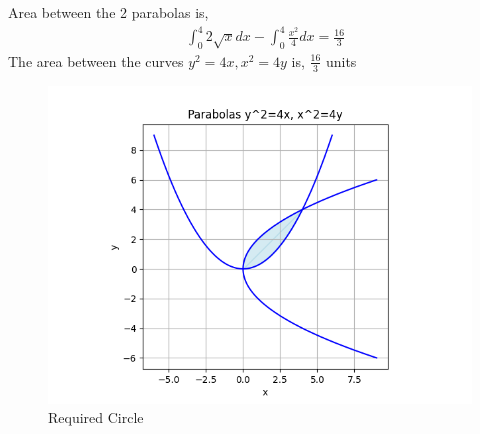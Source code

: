 \documentclass[journal]{IEEEtran}
\begin{document}
Area between the 2 parabolas is,
\begin{align}
	&\int_0^4 2\sqrt{x}dx- \int_0^4 \frac{x^2}{4}dx = \frac{16}{3}
\end{align}
The area between the curves $y^2=4x, x^2=4y$ is, $\frac{16}{3}$ units
\begin{figure}[h!]
   \centering
   \includegraphics[width = 1\linewidth]{figs/fig.png}
   \caption{Required Circle}
   \label{stemplot}
\end{figure}
\end{document}
